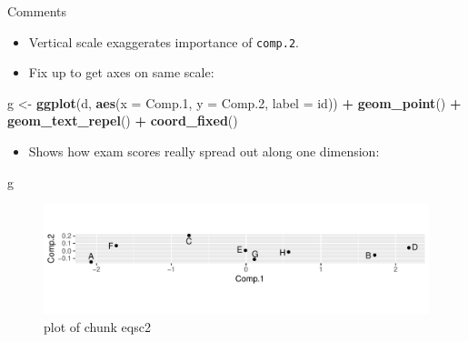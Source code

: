 \documentclass[ignorenonframetext,]{beamer}
\newenvironment{Shaded}{\begin{snugshade}}{\end{snugshade}}
\newcommand{\DataTypeTok}[1]{\textcolor[rgb]{0.13,0.29,0.53}{#1}}
\newcommand{\FloatTok}[1]{\textcolor[rgb]{0.00,0.00,0.81}{#1}}
\newcommand{\KeywordTok}[1]{\textcolor[rgb]{0.13,0.29,0.53}{\textbf{#1}}}
\newcommand{\NormalTok}[1]{#1}
\newcommand{\OperatorTok}[1]{\textcolor[rgb]{0.81,0.36,0.00}{\textbf{#1}}}
\newcommand{\StringTok}[1]{\textcolor[rgb]{0.31,0.60,0.02}{#1}}
\providecommand{\tightlist}{%
  \setlength{\itemsep}{0pt}\setlength{\parskip}{0pt}}
\begin{document}
\begin{frame}[fragile]{Comments}
\protect\hypertarget{comments-32}{}

\begin{itemize}
\item
  Vertical scale exaggerates importance of \texttt{comp.2}.
\item
  Fix up to get axes on same scale:
\end{itemize}

\begin{Shaded}
\begin{Highlighting}[]
\NormalTok{g <-}\StringTok{ }\KeywordTok{ggplot}\NormalTok{(d, }\KeywordTok{aes}\NormalTok{(}\DataTypeTok{x =}\NormalTok{ Comp}\FloatTok{.1}\NormalTok{, }\DataTypeTok{y =}\NormalTok{ Comp}\FloatTok{.2}\NormalTok{, }\DataTypeTok{label =}\NormalTok{ id)) }\OperatorTok{+}
\StringTok{  }\KeywordTok{geom_point}\NormalTok{() }\OperatorTok{+}\StringTok{ }\KeywordTok{geom_text_repel}\NormalTok{() }\OperatorTok{+}
\StringTok{  }\KeywordTok{coord_fixed}\NormalTok{()}
\end{Highlighting}
\end{Shaded}

\begin{itemize}
\tightlist
\item
  Shows how exam scores really spread out along one dimension:
\end{itemize}

\begin{Shaded}
\begin{Highlighting}[]
\NormalTok{g}
\end{Highlighting}
\end{Shaded}

\begin{figure}
\centering
\includegraphics{figure/eqsc2-1.pdf}
\caption{plot of chunk eqsc2}
\end{figure}

\end{frame}
\end{document}
